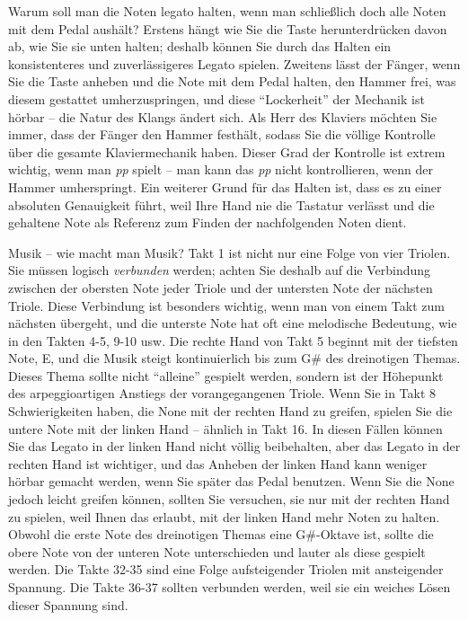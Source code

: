 Warum soll man die Noten legato halten, wenn man schließlich doch alle Noten mit dem Pedal aushält?
Erstens hängt wie Sie die Taste herunterdrücken davon ab, wie Sie sie unten halten; deshalb können Sie durch das Halten ein konsistenteres und zuverlässigeres Legato spielen.
Zweitens lässt der Fänger, wenn Sie die Taste anheben und die Note mit dem Pedal halten, den Hammer frei, was diesem gestattet umherzuspringen, und diese \enquote{Lockerheit} der Mechanik ist hörbar -- die Natur des Klangs ändert sich.
Als Herr des Klaviers möchten Sie immer, dass der Fänger den Hammer festhält, sodass Sie die völlige Kontrolle über die gesamte Klaviermechanik haben.
Dieser Grad der Kontrolle ist extrem wichtig, wenn man \textit{pp} spielt -- man kann das \textit{pp} nicht kontrollieren, wenn der Hammer umherspringt.
Ein weiterer Grund für das Halten ist, dass es zu einer absoluten Genauigkeit führt, weil Ihre Hand nie die Tastatur verlässt und die gehaltene Note als Referenz zum Finden der nachfolgenden Noten dient.

Musik -- wie macht man Musik?
Takt 1 ist nicht nur eine Folge von vier Triolen.
Sie müssen logisch \textit{verbunden} werden; achten Sie deshalb auf die Verbindung zwischen der obersten Note jeder Triole und der untersten Note der nächsten Triole.
Diese Verbindung ist besonders wichtig, wenn man von einem Takt zum nächsten übergeht, und die unterste Note hat oft eine melodische Bedeutung, wie in den Takten 4-5, 9-10 usw.
Die rechte Hand von Takt 5 beginnt mit der tiefsten Note, E, und die Musik steigt kontinuierlich bis zum G\# des dreinotigen Themas.
Dieses Thema sollte nicht \enquote{alleine} gespielt werden, sondern ist der Höhepunkt des arpeggioartigen Anstiegs der vorangegangenen Triole.
Wenn Sie in Takt 8 Schwierigkeiten haben, die None mit der rechten Hand zu greifen, spielen Sie die untere Note mit der linken Hand -- ähnlich in Takt 16.
In diesen Fällen können Sie das Legato in der linken Hand nicht völlig beibehalten, aber das Legato in der rechten Hand ist wichtiger, und das Anheben der linken Hand kann weniger hörbar gemacht werden, wenn Sie später das Pedal benutzen.
Wenn Sie die None jedoch leicht greifen können, sollten Sie versuchen, sie nur mit der rechten Hand zu spielen, weil Ihnen das erlaubt, mit der linken Hand mehr Noten zu halten.
Obwohl die erste Note des dreinotigen Themas eine G\#-Oktave ist, sollte die obere Note von der unteren Note unterschieden und lauter als diese gespielt werden.
Die Takte 32-35 sind eine Folge aufsteigender Triolen mit ansteigender Spannung.
Die Takte 36-37 sollten verbunden werden, weil sie ein weiches Lösen dieser Spannung sind.

